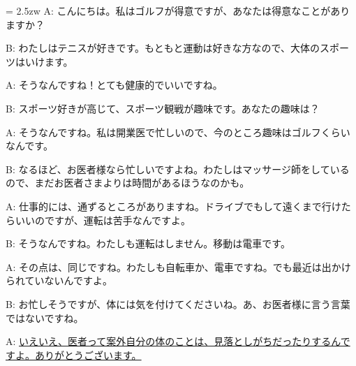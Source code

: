 \documentclass[11pt]{amsart}
\title{}
\author{}
\newenvironment{hangall}[1]{\hangindent = 2.5zw\everypar{\hangindent = 2.5zw}}{}
\begin{document}
\maketitle
\begin{hangall}{}%
A: こんにちは。私はゴルフが得意ですが、あなたは得意なことがありますか？

B: わたしはテニスが好きです。もともと運動は好きな方なので、大体のスポーツはいけます。

A: そうなんですね！とても健康的でいいですね。

B: スポーツ好きが高じて、スポーツ観戦が趣味です。あなたの趣味は？

A: そうなんですね。私は開業医で忙しいので、今のところ趣味はゴルフくらいなんです。

B: なるほど、お医者様なら忙しいですよね。わたしはマッサージ師をしているので、まだお医者さまよりは時間があるほうなのかも。

A: 仕事的には、通ずるところがありますね。ドライブでもして遠くまで行けたらいいのですが、運転は苦手なんですよ。

B: そうなんですね。わたしも運転はしません。移動は電車です。

A: その点は、同じですね。わたしも自転車か、電車ですね。でも最近は出かけられていないんですよ。

B: お忙しそうですが、体には気を付けてくださいね。あ、お医者様に言う言葉ではないですね。

A: \ul{いえいえ、医者って案外自分の体のことは、見落としがちだったりするんですよ。ありがとうございます。}\end{hangall}
\end{document}
